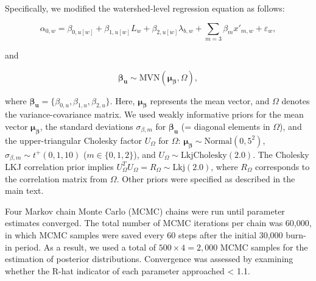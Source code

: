 \documentclass[11pt, class=article, crop=false]{standalone}
\theoremstyle{definition}
\begin{document}
Specifically, we modified the watershed-level regression equation as follows:

\begin{equation}
    \alpha_{0, w} = \beta_{0, u[w]} + \beta_{1, u[w]} L_w + \beta_{2, u[w]} \lambda_{b, w} + \sum_{m=3} \beta_m x'_{m, w} + \varepsilon_{w},
    \label{eq:watershed-average}
\end{equation}

and

\begin{equation}
    \boldsymbol{\beta_u} \sim \mbox{MVN}(\boldsymbol{\mu_{\beta}}, \Omega),
\end{equation}

where $\boldsymbol{\beta_u} = \{\beta_{0, u}, \beta_{1, u}, \beta_{2, u}\}$. Here, $\boldsymbol{\mu_{\beta}}$ represents the mean vector, and $\Omega$ denotes the variance-covariance matrix.
We used weakly informative priors for the mean vector $\boldsymbol{\mu_{\beta}}$, the standard deviations $\sigma_{\beta, m}$ for $\boldsymbol{\beta_u}$ (= diagonal elements in $\Omega$), and the upper-triangular Cholesky factor $U_{\Omega}$ for $\Omega$:  $\boldsymbol{\mu_{\beta}} \sim \mbox{Normal}(0, 5^2)$, $\sigma_{\beta, m} \sim t^+(0, 1, 10)$ ($m \in \{0, 1, 2\}$), and $U_{\Omega} \sim \mbox{LkjCholesky}(2.0)$.
The Cholesky LKJ correlation prior implies $U_{\Omega}^T U_{\Omega} = R_{\Omega} \sim \mbox{Lkj}(2.0)$, where $R_{\Omega}$ corresponds to the correlation matrix from $\Omega$. 
Other priors were specified as described in the main text.

Four Markov chain Monte Carlo (MCMC) chains were run until parameter estimates
converged.
The total number of MCMC iterations per chain was 60,000, in which MCMC samples were saved every 60 steps after the initial 30,000 burn-in period.
As a result, we used a total of $500 \times 4 = 2,000$ MCMC samples for the estimation of posterior distributions.
Convergence was assessed by examining whether the R-hat indicator of each parameter approached < 1.1.

\newpage


\end{document}
